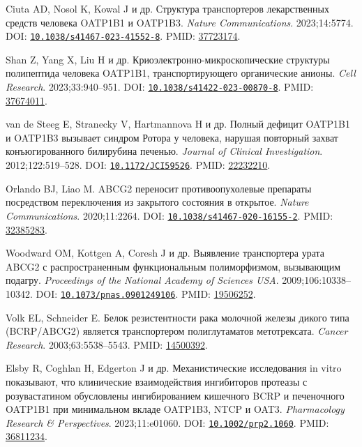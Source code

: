 \documentclass[11pt]{article}
\begin{document}
\begin{description}[before={\microtypesetup{expansion=false}\setlength{\RaggedRightRightskip}{0pt plus 4em}\RaggedRight}]
\item[{[6]}] Ciuta AD, Nosol K, Kowal J и др. Структура транспортеров лекарственных средств человека OATP1B1 и OATP1B3. \textit{\foreignlanguage{english}{Nature Communications}}. 2023;14:5774. DOI: \href{https://doi.org/10.1038/s41467-023-41552-8}{\nolinkurl{10.1038/s41467-023-41552-8}}. PMID: \href{https://pubmed.ncbi.nlm.nih.gov/37723174/}{37723174}.
\item[{[7]}] Shan Z, Yang X, Liu H и др. Криоэлектронно-микроскопические структуры полипептида человека OATP1B1, транспортирующего органические анионы. \textit{\foreignlanguage{english}{Cell Research}}. 2023;33:940--951. DOI: \href{https://doi.org/10.1038/s41422-023-00870-8}{\nolinkurl{10.1038/s41422-023-00870-8}}. PMID: \href{https://pubmed.ncbi.nlm.nih.gov/37674011/}{37674011}.
\item[{[8]}] van de Steeg E, Stranecky V, Hartmannova H и др. Полный дефицит OATP1B1 и OATP1B3 вызывает синдром Ротора у человека, нарушая повторный захват конъюгированного билирубина печенью. \textit{\foreignlanguage{english}{Journal of Clinical Investigation}}. 2012;122:519--528. DOI: \href{https://doi.org/10.1172/JCI59526}{\nolinkurl{10.1172/JCI59526}}. PMID: \href{https://pubmed.ncbi.nlm.nih.gov/22232210/}{22232210}.
\item[{[9]}] Orlando BJ, Liao M. ABCG2 переносит противоопухолевые препараты посредством переключения из закрытого состояния в открытое. \textit{\foreignlanguage{english}{Nature Communications}}. 2020;11:2264. DOI: \href{https://doi.org/10.1038/s41467-020-16155-2}{\nolinkurl{10.1038/s41467-020-16155-2}}. PMID: \href{https://pubmed.ncbi.nlm.nih.gov/32385283/}{32385283}.
\item[{[10]}] Woodward OM, Kottgen A, Coresh J и др. Выявление транспортера урата ABCG2 с распространенным функциональным полиморфизмом, вызывающим подагру. \textit{\foreignlanguage{english}{Proceedings of the National Academy of Sciences USA}}. 2009;106:10338--10342. DOI: \href{https://doi.org/10.1073/pnas.0901249106}{\nolinkurl{10.1073/pnas.0901249106}}. PMID: \href{https://pubmed.ncbi.nlm.nih.gov/19506252/}{19506252}.
\item[{[11]}] Volk EL, Schneider E. Белок резистентности рака молочной железы дикого типа (BCRP/ABCG2) является транспортером полиглутаматов метотрексата. \textit{\foreignlanguage{english}{Cancer Research}}. 2003;63:5538--5543. PMID: \href{https://pubmed.ncbi.nlm.nih.gov/14500392/}{14500392}.
\item[{[12]}] Elsby R, Coghlan H, Edgerton J и др. Механистические исследования in vitro показывают, что клинические взаимодействия ингибиторов протеазы с розувастатином обусловлены ингибированием кишечного BCRP и печеночного OATP1B1 при минимальном вкладе OATP1B3, NTCP и OAT3. \textit{\foreignlanguage{english}{Pharmacology Research \& Perspectives}}. 2023;11:e01060. DOI: \href{https://doi.org/10.1002/prp2.1060}{\nolinkurl{10.1002/prp2.1060}}. PMID: \href{https://pubmed.ncbi.nlm.nih.gov/36811234/}{36811234}.

\end{description}
\end{document}
